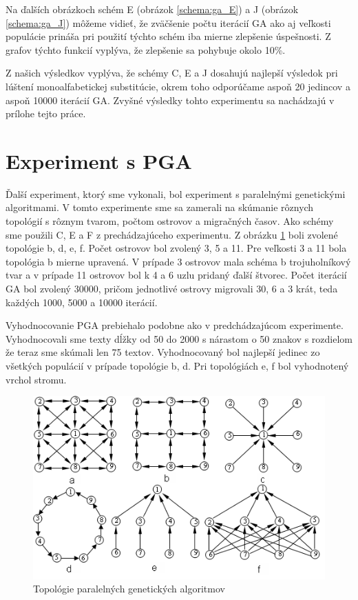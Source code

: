 Na ďalších obrázkoch schém E (obrázok \ref{schema:ga_E}) a J (obrázok \ref{schema:ga_J}) môžeme vidieť, že zväčšenie počtu iterácií GA ako aj veľkosti populácie prináša pri použití týchto schém iba mierne zlepšenie úspešnosti. Z grafov týchto funkcií vyplýva, že zlepšenie sa pohybuje okolo 10\%.

Z našich výsledkov vyplýva, že schémy C, E a J dosahujú najlepší výsledok pri lúštení monoalfabetickej substitúcie, okrem toho odporúčame aspoň 20 jedincov a aspoň 10000 iterácií GA. Zvyšné výsledky tohto experimentu sa nachádzajú v prílohe tejto práce.




\clearpage
\section{Experiment s PGA}
Ďalší experiment, ktorý sme vykonali, bol experiment s paralelnými genetickými algoritmami.
V tomto experimente sme sa zamerali na skúmanie rôznych topológií s rôznym tvarom, počtom ostrovov a migračných časov. Ako schémy sme použili C, E a F z prechádzajúceho experimentu.
Z obrázku \ref{img:topology} boli zvolené topológie b, d, e, f. Počet ostrovov bol zvolený 3, 5 a 11. Pre veľkosti 3 a 11 bola topológia b mierne upravená.
V prípade 3 ostrovov mala schéma b trojuholníkový tvar a v prípade 11 ostrovov bol k 4 a 6 uzlu pridaný ďalší štvorec.
Počet iterácií GA bol zvolený 30000, pričom jednotlivé ostrovy migrovali 30, 6 a 3 krát, teda každých 1000, 5000 a 10000 iterácií.

Vyhodnocovanie PGA prebiehalo podobne ako v predchádzajúcom experimente. Vyhodnocovali sme texty dĺžky od 50 do 2000 s nárastom o 50 znakov s rozdielom že teraz sme skúmali len 75 textov. Vyhodnocovaný bol najlepší jedinec zo všetkých populácií v prípade topológie b, d. Pri topológiách e, f bol vyhodnotený vrchol stromu. 
\begin{figure}[!htbp]
  \centering
  \includegraphics[width=\textwidth]{img/topology.png}
  \caption{Topológie paralelných genetických algoritmov \cite{pea}}
  \label{img:topology}
\end{figure}

